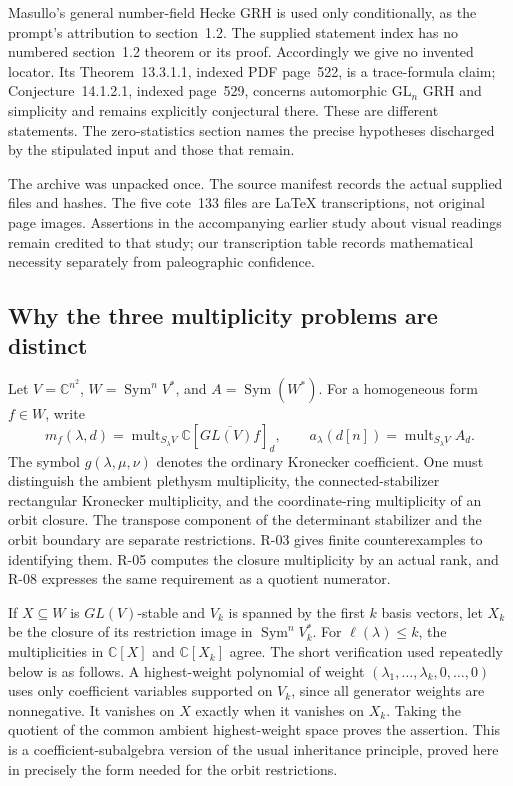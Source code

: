 \documentclass[11pt,a4paper]{article}
\theoremstyle{definition}\newtheorem{definition}{Definition}
\begin{document}
Masullo's general number-field Hecke GRH is used only conditionally, as the prompt's attribution to section~1.2. The supplied statement index has no numbered section~1.2 theorem or its proof. Accordingly we give no invented locator. Its Theorem~13.3.1.1, indexed PDF page~522, is a trace-formula claim; Conjecture~14.1.2.1, indexed page~529, concerns automorphic $\mathrm{GL}_n$ GRH and simplicity and remains explicitly conjectural there. These are different statements. The zero-statistics section names the precise hypotheses discharged by the stipulated input and those that remain.

The archive was unpacked once. The source manifest records the actual supplied files and hashes. The five cote~133 files are LaTeX transcriptions, not original page images. Assertions in the accompanying earlier study about visual readings remain credited to that study; our transcription table records mathematical necessity separately from paleographic confidence.

\subsection{Why the three multiplicity problems are distinct}

Let $V=\mathbb C^{n^2}$, $W=\operatorname{Sym}^nV^*$, and $A=\operatorname{Sym}(W^*)$. For a homogeneous form $f\in W$, write
\[
 m_f(\lambda,d)=\operatorname{mult}_{S_\lambda V}\mathbb C[\overline{GL(V)f}]_d,
 \qquad a_\lambda(d[n])=\operatorname{mult}_{S_\lambda V}A_d.
\]
The symbol $g(\lambda,\mu,\nu)$ denotes the ordinary Kronecker coefficient. One must distinguish the ambient plethysm multiplicity, the connected-stabilizer rectangular Kronecker multiplicity, and the coordinate-ring multiplicity of an orbit closure. The transpose component of the determinant stabilizer and the orbit boundary are separate restrictions. R-03 gives finite counterexamples to identifying them. R-05 computes the closure multiplicity by an actual rank, and R-08 expresses the same requirement as a quotient numerator.

If $X\subseteq W$ is $GL(V)$-stable and $V_k$ is spanned by the first $k$ basis vectors, let $X_k$ be the closure of its restriction image in $\operatorname{Sym}^nV_k^*$. For $\ell(\lambda)\leq k$, the multiplicities in $\mathbb C[X]$ and $\mathbb C[X_k]$ agree. The short verification used repeatedly below is as follows. A highest-weight polynomial of weight $(\lambda_1,\ldots,\lambda_k,0,\ldots,0)$ uses only coefficient variables supported on $V_k$, since all generator weights are nonnegative. It vanishes on $X$ exactly when it vanishes on $X_k$. Taking the quotient of the common ambient highest-weight space proves the assertion. This is a coefficient-subalgebra version of the usual inheritance principle, proved here in precisely the form needed for the orbit restrictions.
\end{document}
